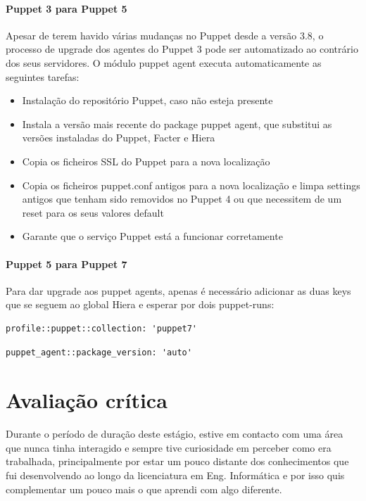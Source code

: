 \documentclass{article}
\begin{document}
\paragraph{Puppet 3 para Puppet 5}
Apesar de terem havido várias mudanças no Puppet desde a versão 3.8, o processo de upgrade dos agentes do Puppet 3 pode ser automatizado ao contrário dos seus servidores. O módulo puppet agent executa automaticamente as seguintes tarefas:
\begin{itemize}
    \item Instalação do repositório Puppet, caso não esteja presente
    \item Instala a versão mais recente do package puppet agent, que substitui as versões instaladas do Puppet, Facter e Hiera
    \item Copia os ficheiros SSL do Puppet para a nova localização
    \item Copia os ficheiros puppet.conf antigos para a nova localização e limpa settings antigos que tenham sido removidos no Puppet 4 ou que necessitem de um reset para os seus valores default
    \item Garante que o serviço Puppet  está a funcionar corretamente
\end{itemize}

\paragraph{Puppet 5 para Puppet 7} 
Para dar upgrade aos puppet agents, apenas é necessário adicionar as duas keys que se seguem ao global Hiera e esperar por dois puppet-runs:
\begin{lstlisting}
profile::puppet::collection: 'puppet7'
\end{lstlisting}
\begin{lstlisting}
puppet_agent::package_version: 'auto'
\end{lstlisting}

\cleardoublepage
\section{Avaliação crítica}
Durante o período de duração deste estágio, estive em contacto com uma área que nunca tinha interagido e sempre tive curiosidade em perceber como era trabalhada, principalmente por estar um pouco distante dos conhecimentos que fui desenvolvendo ao longo da licenciatura em Eng. Informática e por isso quis complementar um pouco mais o que aprendi com algo diferente.
\end{document}
